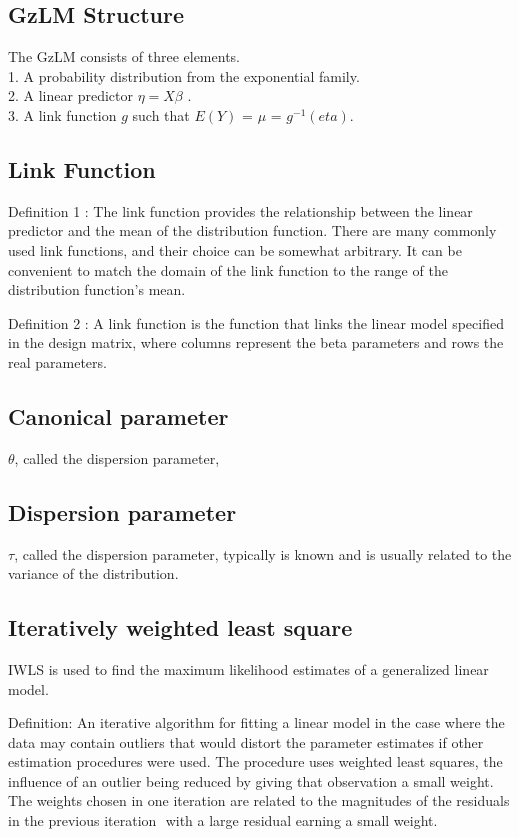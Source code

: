 \documentclass[12pt, a4paper]{report}
\theoremstyle{plain}
\theoremstyle{definition}
\theoremstyle{remark}
\begin{document}
	
	\subsection{GzLM Structure}
	The GzLM consists of three elements. \\1. A probability
	distribution from the exponential family. \\2. A linear predictor
	$\eta= X\beta$ . \\3. A link function $g$ such that $E(Y)$ = $\mu$
	= $g^{-1}(eta)$.
	
	\subsection{Link Function}
	Definition 1 : The link function provides the relationship between
	the linear predictor and the mean of the distribution function.
	There are many commonly used link functions, and their choice can
	be somewhat arbitrary. It can be convenient to match the domain of
	the link function to the range of the distribution function's
	mean.
	
	\noindent Definition 2 : A link function is the function that
	links the linear model specified in the design matrix, where
	columns represent the beta parameters and rows the real
	parameters.
	
	\subsection{Canonical parameter}
	$\theta$, called the dispersion parameter,
	\subsection{Dispersion parameter}
	$\tau$, called the dispersion parameter, typically is known and is
	usually related to the variance of the distribution.
	
	\subsection{Iteratively weighted least square}
	IWLS is used to find the maximum likelihood estimates of a
	generalized linear model.
	
	\noindent Definition: An iterative algorithm for fitting a linear
	model in the case where the data may contain outliers that would
	distort the parameter estimates if other estimation procedures
	were used. The procedure uses weighted least squares, the
	influence of an outlier being reduced by giving that observation a
	small weight. The weights chosen in one iteration are related to
	the magnitudes of the residuals in the previous iteration  with a
	large residual earning a small weight.
	
\end{document}
